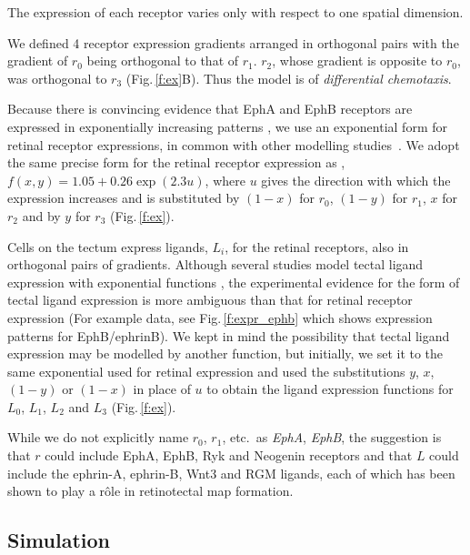 \documentclass[9pt,lineno,draft]{elife}
\begin{document}
The expression of each receptor varies only with respect to one spatial dimension.

We defined 4 receptor expression gradients arranged in orthogonal pairs with the gradient of $r_0$ being orthogonal to that of $r_1$. $r_2$, whose gradient is opposite to $r_0$, was orthogonal to $r_3$ (Fig.\,\ref{f:ex}B). Thus the model is of \emph{differential chemotaxis}.

Because there is convincing evidence that EphA and EphB receptors are expressed in exponentially increasing patterns \citep{reber_relative_2004,feldheim_genetic_2000,brown_topographic_2000,koulakov_stochastic_2004}, we use an exponential form for retinal receptor expressions, in common with other modelling studies~\citep{reber_relative_2004,koulakov_stochastic_2004,simpson_simple_2011}.
%
We adopt the same precise form for the retinal receptor expression as \citet{simpson_simple_2011}, $f(x,y) = 1.05 + 0.26 \exp(2.3 u)$, where $u$ gives the direction with which the expression increases and is substituted by $(1-x)$ for $r_0$, $(1-y)$ for $r_1$, $x$ for $r_2$ and by $y$ for $r_3$ (Fig.\,\ref{f:ex}).

Cells on the tectum express ligands, $L_i$, for the retinal receptors, also in orthogonal pairs of gradients.
Although several studies model tectal ligand expression with exponential functions \citep{koulakov_stochastic_2004}, the experimental evidence for the form of tectal ligand expression is more ambiguous than that for retinal receptor expression (For example data, see Fig.\,\ref{f:expr_ephb} which shows expression patterns for EphB/ephrinB).
We kept in mind the possibility that tectal ligand expression may be modelled by another function, but initially, we set it to the same exponential used for retinal expression and used the substitutions $y$, $x$, $(1-y)$ or $(1-x)$ in place of $u$ to obtain the ligand expression functions for $L_0$, $L_1$, $L_2$ and $L_3$ (Fig.\,\ref{f:ex}).

While we do not explicitly name $r_0$, $r_1$, etc.~as \emph{EphA}, \emph{EphB}, the suggestion is that $r$ could include EphA, EphB, Ryk \citep{schmitt_wntryk_2006} and Neogenin \citep{rajagopalan_neogenin_2004} receptors and that $L$ could include the ephrin-A, ephrin-B, Wnt3 \citep{schmitt_wntryk_2006} and RGM \citep{monnier_rgm_2002} ligands, each of which has been shown to play a r\^ole in retinotectal map formation.

\subsection*{Simulation} %
\end{document}
